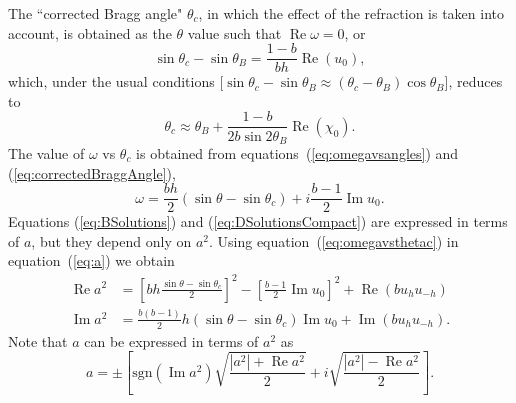 \documentclass[preprint]{iucr}              %
\begin{document}
The ``corrected Bragg angle" $\theta_c$, in which the effect of the refraction is taken into account, is obtained as the $\theta$ value such that $\operatorname{Re} \omega=0$, or
\begin{equation}\label{eq:correctedBraggAngleExact}
   \sin\theta_c - \sin\theta_B = \frac{1-b}{b h} \operatorname{Re}(u_0),  
\end{equation}
which, under the usual conditions [$\sin\theta_c-\sin\theta_B \approx  (\theta_c-\theta_B) \cos\theta_B$], reduces to
\begin{equation}\label{eq:correctedBraggAngle}
   \theta_c \approx \theta_B + \frac{1-b}{2 b \sin2\theta_B} \operatorname{Re}(\chi_0).  
\end{equation}
The value of $\omega$ vs $\theta_c$ is obtained from equations~(\ref{eq:omegavsangles}) and (\ref{eq:correctedBraggAngle}),
\begin{equation}\label{eq:omegavsthetac}
    \omega=\frac{b h}{2} (\sin\theta-\sin\theta_c) + i \frac{b-1}{2} \operatorname{Im}u_0.
\end{equation}
Equations (\ref{eq:BSolutions}) and (\ref{eq:DSolutionsCompact}) are expressed in terms of $a$, but they depend only on $a^2$. 
Using equation~(\ref{eq:omegavsthetac}) in equation~(\ref{eq:a}) we obtain
\begin{subequations}\label{eq:avsthetac}
\begin{align}
\operatorname{Re}a^2&=\left[ bh
\frac{\sin\theta-\sin\theta_c}{2}
\right]^2 - \left[ \frac{b-1}{2}\operatorname{Im}u_0 \right]^2 + \operatorname{Re}(b u_h u_{-h})  \\
\operatorname{Im}a^2 &= \frac{b(b-1)}{2} h  (\sin\theta-\sin\theta_c) \operatorname{Im}u_0 + \operatorname{Im} (b u_h u_{-h}). 
\end{align}
\end{subequations}
Note that $a$ can be expressed in terms of $a^2$ as
\begin{equation}\label{eq:asigned}
    a = \pm \left[ \text{sgn}(\operatorname{Im}a^2)\sqrt{\frac{|a^2| + \operatorname{Re} a^2}{2}} + i \sqrt{\frac{|a^2|-\operatorname{Re}a^2}{2}} \right].
\end{equation}
\end{document}
